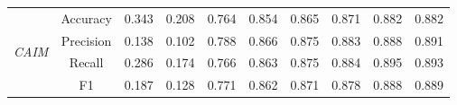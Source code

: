 \begin{table}[H]
\begin{tabular}{|c|c|c|c|c|c|c|c|c|c|}
                                            \multirow{4}{*}{\textit{CAIM}}  & Accuracy & 0.343 & 0.208 & 0.764 & 0.854 & 0.865 & 0.871 & 0.882 & 0.882 \\ \cline{2-10}
                                             & Precision & 0.138 & 0.102 & 0.788 & 0.866 & 0.875 & 0.883 & 0.888 & 0.891 \\ \cline{2-10}
                                             & Recall & 0.286 & 0.174 & 0.766 & 0.863 & 0.875 & 0.884 & 0.895 & 0.893 \\ \cline{2-10}
                                             & F1 & 0.187 & 0.128 & 0.771 & 0.862 & 0.871 & 0.878 & 0.888 & 0.889 \\ \hline \hline

            \hline
        \end{tabular}
    \end{table}

